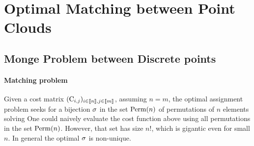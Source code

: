 
\section{Optimal Matching between Point Clouds}

\subsection{Monge Problem between Discrete points}
\label{sec-monge-pbm}

\paragraph{Matching problem}

Given a cost matrix $(\mathrm{C}_{i,j})_{i \in \llbracket n\rrbracket, j \in \llbracket m\rrbracket}$, assuming $n=m$, the optimal assignment problem seeks for a bijection $\sigma$ in the set $\mathrm{Perm}(n)$ of permutations of $n$ elements solving
One could naively evaluate the cost function above using all permutations in the set $\mathrm{Perm}(n)$. However, that set has size $n!$, which is gigantic even for small $n$. 
In general the optimal $\sigma$ is non-unique. 




